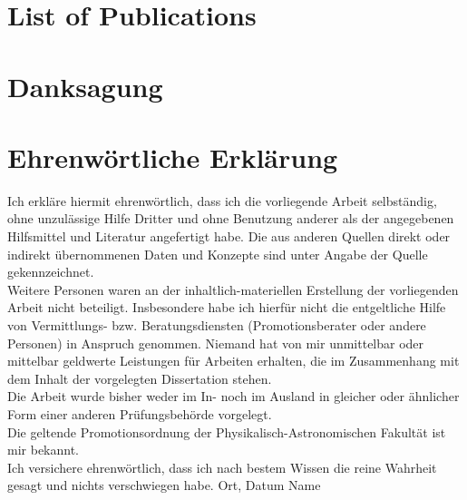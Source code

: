 \documentclass[headsepline, 12pt, openright, german, english]{scrbook}
\begin{document}
%
\newpage
{}



\newpage
\mbox{}
\thispagestyle{empty}
\newpage
\chapter*{List of Publications}




\chapter*{Danksagung}



\newpage
\mbox{}
\thispagestyle{empty}
\newpage

\chapter*{Ehrenwörtliche Erklärung}

Ich erkläre hiermit ehrenwörtlich, dass ich die vorliegende Arbeit selbständig, ohne unzulässige Hilfe Dritter und ohne Benutzung anderer als der angegebenen Hilfsmittel und Literatur angefertigt habe. Die aus anderen Quellen direkt oder indirekt übernommenen Daten und Konzepte sind unter Angabe der Quelle gekennzeichnet.\\ \newline
Weitere Personen waren an der inhaltlich-materiellen Erstellung der vorliegenden Arbeit nicht beteiligt. Insbesondere habe ich hierfür nicht die entgeltliche Hilfe von Vermittlungs- bzw. Beratungsdiensten (Promotionsberater oder andere Personen) in Anspruch genommen. Niemand hat von mir unmittelbar oder mittelbar geldwerte Leistungen für Arbeiten erhalten, die im Zusammenhang mit dem Inhalt der vorgelegten Dissertation stehen.\\ \newline
Die Arbeit wurde bisher weder im In- noch im Ausland in gleicher oder ähnlicher Form einer anderen Prüfungsbehörde vorgelegt.\\ \newline
Die geltende Promotionsordnung der Physikalisch-Astronomischen Fakultät ist mir bekannt.\\ \newline
Ich versichere ehrenwörtlich, dass ich nach bestem Wissen die reine Wahrheit gesagt und nichts verschwiegen habe.
\vfill
Ort, Datum \hfill Name
\vspace{2cm}
\end{document}
